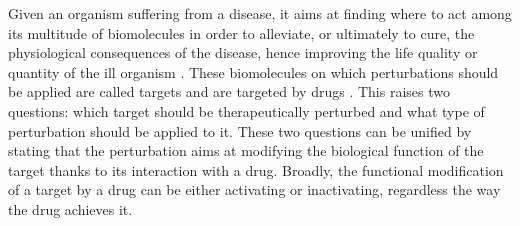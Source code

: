 \documentclass[oneside,a4paper,onecolumn,notitlepage]{article}
\begin{document}
Given an organism suffering from a disease, it aims at finding where to act among its multitude of biomolecules in order to alleviate, or ultimately to cure, the physiological consequences of the disease, hence improving the life quality or quantity of the ill organism \cite{knowles2003target}. These biomolecules on which perturbations should be applied are called targets and are targeted by drugs \cite{imming2006drugs}. This raises two questions: which target should be therapeutically perturbed and what type of perturbation should be applied to it. These two questions can be unified by stating that the perturbation aims at modifying the biological function of the target thanks to its interaction with a drug. Broadly, the functional modification of a target by a drug can be either activating or inactivating, regardless the way the drug achieves it.
\end{document}
